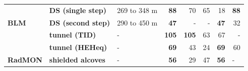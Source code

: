 \documentclass[encoding=utf8,british]{tumphthesis}
\begin{document}
\begin{table}[H]
{\begin{tabular}{|l|l|l|r|rrrr|}
                                                           & \textbf{DS (single step)}                                  & 269 to 348 m                                                        & \textbf{88}                                                              & 70                                                        & 65                                                        & 18                                                        & \textbf{88}                                                     \\ 
\multirow{-4}{*}{\textbf{BLM}}                             & \cellcolor[HTML]{CFE2F3}\textbf{DS (second step)}          & \cellcolor[HTML]{CFE2F3}290 to 450 m                                & \cellcolor[HTML]{CFE2F3}\textbf{47}                                      & \multicolumn{1}{r}{\cellcolor[HTML]{CFE2F3}-}             & \multicolumn{1}{r}{\cellcolor[HTML]{CFE2F3}-}             & \cellcolor[HTML]{CFE2F3}\textbf{47}                       & \cellcolor[HTML]{CFE2F3}32                                      \\ \hline
\cellcolor[HTML]{CFE2F3}                                   & \textbf{tunnel (TID)}                                      & -                                                                   & \textbf{105}                                                             & \textbf{105}                                              & 63                                                        & 67                                                        & \multicolumn{1}{r|}{-}                                           \\
\rowcolor[HTML]{CFE2F3} 
\cellcolor[HTML]{CFE2F3}                                   & \textbf{tunnel (HEHeq)}                                    & -                                                                   & \textbf{69}                                                              & 43                                                        & 24                                                        & \textbf{69}                                               & 60                                                              \\
\multirow{-3}{*}{\cellcolor[HTML]{CFE2F3}\textbf{RadMON}}  & \textbf{shielded alcoves}                                  & -                                                                   & \textbf{56}                                                              & 29                                                        & 47                                                        & \textbf{56}                                               & \multicolumn{1}{l|}{-}                                           \\ \hline

\end{tabular}}
\end{table}
\end{document}
